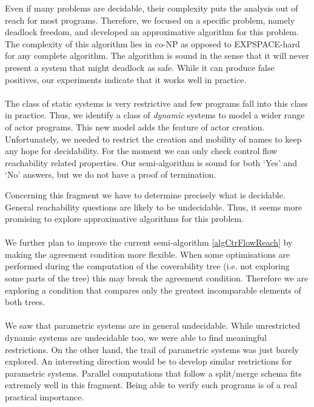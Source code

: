 \documentclass[a4paper]{report}
\numberwithin{algorithm}{chapter}
\begin{document}
Even if many problems are decidable, their complexity puts the analysis out of reach for most programs.
Therefore, we focused on a specific problem, namely deadlock freedom, and developed an approximative algorithm for this problem.
The complexity of this algorithm lies in co-NP as opposed to EXPSPACE-hard for any complete algorithm.
The algorithm is sound in the sense that it will never present a system that might deadlock as safe.
While it can produce false positives, our experiments indicate that it works well in practice.


\paragraph{}
The class of static systems is very restrictive and few programs fall into this class in practice.
Thus, we identify a class of \emph{dynamic} systems to model a wider range of actor programs.
This new model adds the feature of actor creation.
Unfortunately, we needed to restrict the creation and mobility of names to keep any hope for decidability.
For the moment we can only check control flow reachability related properties.
Our semi-algorithm is sound for both `Yes' and `No' answers, but we do not have a proof of termination.

Concerning this fragment we have to determine precisely what is decidable.
General reachability questions are likely to be undecidable.
Thus, it seems more promising to explore approximative algorithms for this problem.

\paragraph{}
We further plan to improve the current semi-algorithm \ref{algCtrFlowReach} by making the agreement condition more flexible.
When some optimisations are performed during the computation of the coverability tree (i.e. not exploring some parts of the tree) this may break the agreement condition.
Therefore we are exploring a condition that compares only the greatest incomparable elements of both trees.

\paragraph{}
We saw that parametric systems are in general undecidable.
While unrestricted dynamic systems are undecidable too, we were able to find meaningful restrictions.
On the other hand, the trail of parametric systems was just barely explored.
An interesting direction would be to develop similar restrictions for parametric systems.
Parallel computations that follow a split/merge schema fits extremely well in this fragment.
Being able to verify such programs is of a real practical importance.
\end{document}
